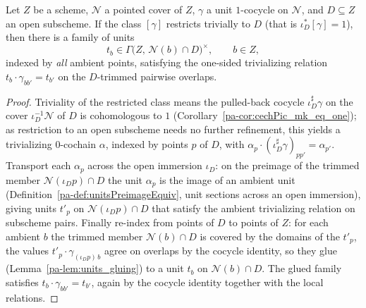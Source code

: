 \begin{theorem}
  \label{pa-thm:exists_trimmed_trivializing}
  \leanok

  Let \(Z\) be a scheme, \(\mathcal N\) a pointed cover of \(Z\), \(\gamma\) a unit \(1\)-cocycle on
  \(\mathcal N\), and \(D \subseteq Z\) an open subscheme. If the class \([\gamma]\) restricts
  trivially to \(D\) (that is \(\iota_D^{*}[\gamma] = 1\)), then there is a family of units
  \[
    t_b \in \Gamma\bigl(Z,\, \mathcal N(b) \cap D\bigr)^{\times}, \qquad b \in Z,
  \]
  indexed by \emph{all} ambient points, satisfying the one-sided trivializing relation \(t_b \cdot
  \gamma_{b b'} = t_{b'}\) on the \(D\)-trimmed pairwise overlaps.
\end{theorem}
\begin{proof}
  \leanok
  Triviality of the restricted class means the pulled-back cocycle \(\iota_D^{\sharp}\gamma\) on the
  cover \(\iota_D^{-1}\mathcal N\) of \(D\) is cohomologous to \(1\)
  (Corollary~\ref{pa-cor:cechPic_mk_eq_one}); as restriction to an open subscheme needs no further
  refinement, this yields a trivializing \(0\)-cochain \(\alpha\), indexed by points \(p\) of \(D\),
  with \(\alpha_p \cdot (\iota_D^{\sharp}\gamma)_{p p'} = \alpha_{p'}\). Transport each \(\alpha_p\)
  across the open immersion \(\iota_D\): on the preimage of the trimmed member \(\mathcal
  N(\iota_D p) \cap D\) the unit \(\alpha_p\) is the image of an ambient unit
  (Definition~\ref{pa-def:unitsPreimageEquiv}, unit sections across an open immersion), giving units
  \(t'_p\) on \(\mathcal N(\iota_D p) \cap D\) that satisfy the ambient trivializing relation on
  subscheme pairs. Finally re-index from points of \(D\) to points of \(Z\): for each ambient \(b\)
  the trimmed member \(\mathcal N(b) \cap D\) is covered by the domains of the \(t'_p\), the values
  \(t'_p \cdot \gamma_{(\iota_D p)\, b}\) agree on overlaps by the cocycle identity, so they glue
  (Lemma~\ref{pa-lem:units_gluing}) to a unit \(t_b\) on \(\mathcal N(b) \cap D\). The glued family
  satisfies \(t_b \cdot \gamma_{b b'} = t_{b'}\), again by the cocycle identity together with the
  local relations.
\end{proof}

